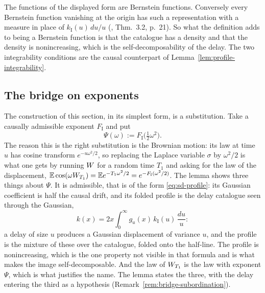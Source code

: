 The functions of the displayed form are Bernstein functions. Conversely every Bernstein
function vanishing at the origin has such a representation with a measure in place of
$k_{\mathrm I}(u)\,du/u$ (, Thm.~3.2, p.~21). So what the
definition adds to being a Bernstein function is that the catalogue has a density and that
the density is nonincreasing, which is the self-decomposability of the delay. The two
integrability conditions are the causal counterpart of Lemma~\ref{lem:profile-integrability}.

\subsection{The bridge on exponents}\label{sec:bridge-exponents}

The construction of this section, in its simplest form, is a substitution. Take a causally
admissible exponent $F_{\mathrm I}$ and put
\[
  \Psi(\omega) := F_{\mathrm I}\bigl(\tfrac12\omega^2\bigr) .
\]
The reason this is the right substitution is the Brownian motion: its law at time $u$ has
cosine transform $e^{-u\omega^2/2}$, so replacing the Laplace variable $\sigma$ by
$\omega^2/2$ is what one gets by running $W$ for a random time $T_1$ and asking for the law of
the displacement, $\mathbb{E}\cos(\omega W_{T_1}) = \mathbb{E}e^{-T_1\omega^2/2}
= e^{-F_{\mathrm I}(\omega^2/2)}$. The lemma shows three things about $\Psi$. It is admissible,
that is of the form \ref{eq:sd-profile}: its Gaussian coefficient is
half the causal drift, and its folded profile is the delay catalogue seen through the Gaussian,
\[
  k(x) = 2x\int_0^\infty g_u(x)\,k_{\mathrm I}(u)\,\frac{du}{u} :
\]
a delay of size $u$ produces a Gaussian displacement of variance $u$, and the profile is the
mixture of these over the catalogue, folded onto the half-line. The profile is nonincreasing,
which is the one property not visible in that formula and is what makes the image
self-decomposable. And the law of $W_{T_1}$ is the law with exponent $\Psi$, which is what
justifies the name. The lemma states the three, with the delay entering the third as a
hypothesis (Remark~\ref{rem:bridge-subordination}).

